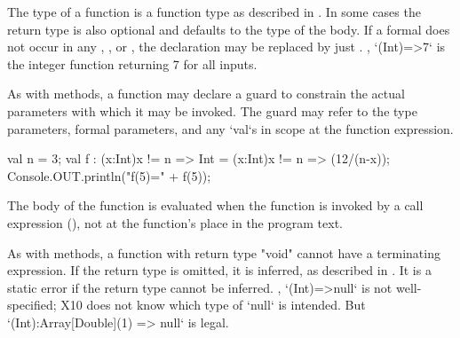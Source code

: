 The type of a function is a function type as described in .  In some
cases the 
return type  is also optional and defaults to the type of the
body. If a formal  does not occur in any
, ,  or , the declaration  may
be replaced by just . \Eg,  \xcd`(Int)=>7` is the integer function returning
7 for all inputs.

\label{ClosureGuard}


As with methods, a function may declare a guard to
constrain the actual parameters with which it may be invoked.
The guard may refer to the type parameters, formal parameters,
and any \xcd`val`s in scope at the function expression.

\begin{ex}
\begin{xten}
    val n = 3;
    val f : (x:Int){x != n} => Int  
          = (x:Int){x != n} => (12/(n-x));
    Console.OUT.println("f(5)=" + f(5));    
\end{xten}

\end{ex}

The body of the function is evaluated when the function is
invoked by a call expression (), not at the function's
place in the program text.

As with methods, a function with return type \xcd"void" cannot
have a terminating expression. 
If the return type is omitted, it is inferred, as described in
.
It is a static error if the return type cannot be inferred.  \Eg,
\xcd`(Int)=>null` is not well-specified; X10 does not know which type of
\xcd`null` is intended.  
But \xcd`(Int):Array[Double](1) => null` is legal.


